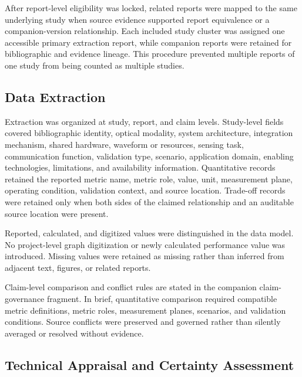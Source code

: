After report-level eligibility was locked, related reports were mapped to the
same underlying study when source evidence supported report equivalence or a
companion-version relationship. Each included study cluster was assigned one
accessible primary extraction report, while companion reports were retained
for bibliographic and evidence lineage. This procedure prevented multiple
reports of one study from being counted as multiple studies.

\subsection{Data Extraction}

Extraction was organized at study, report, and claim levels. Study-level
fields covered bibliographic identity, optical modality, system architecture,
integration mechanism, shared hardware, waveform or resources, sensing task,
communication function, validation type, scenario, application domain,
enabling technologies, limitations, and availability information. Quantitative
records retained the reported metric name, metric role, value, unit,
measurement plane, operating condition, validation context, and source
location. Trade-off records were retained only when both sides of the claimed
relationship and an auditable source location were present.

Reported, calculated, and digitized values were distinguished in the data
model. No project-level graph digitization or newly calculated performance
value was introduced. Missing values were retained as missing rather than
inferred from adjacent text, figures, or related reports.

Claim-level comparison and conflict rules are stated in the companion
claim-governance fragment. In brief, quantitative comparison required
compatible metric definitions, metric roles, measurement planes, scenarios,
and validation conditions. Source conflicts were preserved and governed rather
than silently averaged or resolved without evidence.


\subsection{Technical Appraisal and Certainty Assessment}

